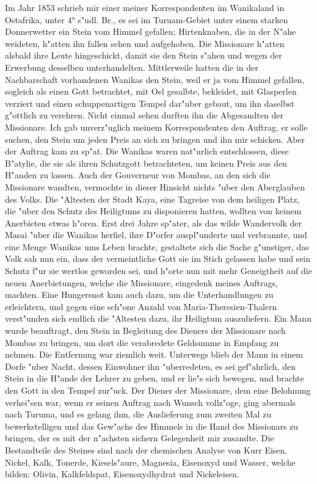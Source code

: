 \documentclass[a4paper, 11pt, oneside]{article}
\begin{document}
Im Jahr 1853 schrieb mir einer meiner Korrespondenten im Wanikaland in Ostafrika, unter 4° s"udl. Br., es sei im Turuam-Gebiet unter einem starken Donnerwetter ein Stein vom Himmel gefallen; Hirtenknaben, die in der N"ahe weideten, h"atten ihn fallen sehen und aufgehoben. Die Missionare h"atten alsbald ihre Leute hingeschickt, damit sie den Stein s"ahen und wegen der Erwerbung desselben unterhandelten. Mittlerweile hatten die in der Nachbarschaft vorhandenen Wanikas den Stein, weil er ja vom Himmel gefallen, sogleich als einen Gott betrachtet, mit Oel gesalbte, bekleidet, mit Glasperlen verziert und einen schuppenartigen Tempel dar"uber gebaut, um ihn daselbst g"ottlich zu verehren. Nicht einmal sehen durften ihn die Abgesandten der Missionare. Ich gab unverz"uglich meinem Korrespondenten den Auftrag, er solle suchen, den Stein um jeden Preis an sich zu bringen und ihn mir schicken. Aber der Auftrag kam zu sp"at. Die Wanikas waren nat"urlich entschlossen, diese B"atylie, die sie als ihren Schutzgott betrachteten, um keinen Preis aus den H"anden zu lassen. Auch der Gouverneur von Mombas, an den sich die Missionare wandten, vermochte in dieser Hinsicht nichts "uber den Aberglauben des Volks. Die "Altesten der Stadt Kaya, eine Tagreise von dem heiligen Platz, die "uber den Schutz des Heiligtums zu disponieren hatten, wollten von keinem Anerbieten etwas h"oren. Erst drei Jahre sp"ater, als das wilde Wandervolk der Masai "uber die Wanikas herfiel, ihre D"orfer auspl"underte und verbrannte, und eine Menge Wanikas ums Leben brachte, gestaltete sich die Sache g"unstiger, das Volk sah nun ein, dass der vermeintliche Gott sie im Stich gelassen habe und sein Schutz f"ur sie wertlos geworden sei, und h"orte nun mit mehr Geneigtheit auf die neuen Anerbietungen, welche die Missionare, eingedenk meines Auftrags, machten. Eine Hungersnot kam auch dazu, um die Unterhandlungen zu erleichtern, und gegen eine sch"one Anzahl von Maria-Theresien-Thalern verst"unden sich endlich die "Altesten dazu, ihr Heiligtum auszuliefern. Ein Mann wurde beauftragt, den Stein in Begleitung des Dieners der Missionare nach Mombas zu bringen, um dort die verabredete Geldsumme in Empfang zu nehmen. Die Entfernung war ziemlich weit. Unterwegs blieb der Mann in einem Dorfe "uber Nacht, dessen Einwohner ihn "uberredeten, es sei gef"ahrlich, den Stein in die H"ande der Lehrer zu geben, und er lie"s sich bewegen, und brachte den Gott in den Tempel zur"uck. Der Diener der Missionare, dem eine Belohnung verhei"sen war, wenn er seinen Auftrag nach Wunsch vollz"oge, ging abermals nach Turuma, und es gelang ihm, die Auslieferung zum zweiten Mal zu bewerkstelligen und das Gew"achs des Himmels in die Hand des Missionars zu bringen, der es mit der n"achsten sichern Gelegenheit mir zusandte. Die Bestandteile des Steines sind nach der chemischen Analyse von Kurr Eisen, Nickel, Kalk, Tonerde, Kiesels"aure, Magnesia, Eisenoxyd und Wasser, welche bilden: Olivin, Kalkfeldspat, Eisenoxydhydrat und Nickeleisen.
\end{document}
